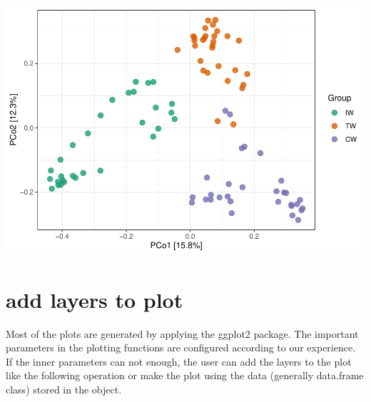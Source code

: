 \documentclass[
]{book}
\newenvironment{Shaded}{\begin{snugshade}}{\end{snugshade}}
\newcommand{\AttributeTok}[1]{\textcolor[rgb]{0.77,0.63,0.00}{#1}}
\newcommand{\CommentTok}[1]{\textcolor[rgb]{0.56,0.35,0.01}{\textit{#1}}}
\newcommand{\ConstantTok}[1]{\textcolor[rgb]{0.00,0.00,0.00}{#1}}
\newcommand{\DecValTok}[1]{\textcolor[rgb]{0.00,0.00,0.81}{#1}}
\newcommand{\FunctionTok}[1]{\textcolor[rgb]{0.00,0.00,0.00}{#1}}
\newcommand{\NormalTok}[1]{#1}
\newcommand{\OtherTok}[1]{\textcolor[rgb]{0.56,0.35,0.01}{#1}}
\newcommand{\SpecialCharTok}[1]{\textcolor[rgb]{0.00,0.00,0.00}{#1}}
\newcommand{\StringTok}[1]{\textcolor[rgb]{0.31,0.60,0.02}{#1}}
\begin{document}
\includegraphics{microeco-tutorial_files/figure-latex/unnamed-chunk-287-1.pdf}

\hypertarget{add-layers-to-plot}{%
\section{add layers to plot}\label{add-layers-to-plot}}

Most of the plots are generated by applying the ggplot2 package.
The important parameters in the plotting functions are configured according to our experience.
If the inner parameters can not enough, the user can add the layers to the plot like the following operation or
make the plot using the data (generally data.frame class) stored in the object.

\begin{Shaded}
\end{Shaded}
\end{document}
